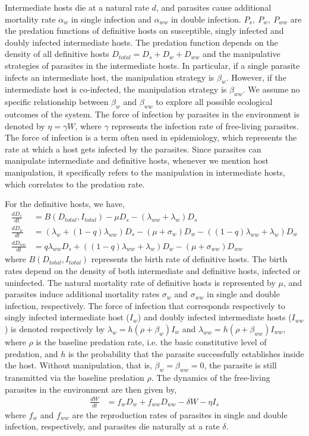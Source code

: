 \documentclass[a4paper]{scrartcl}
\begin{document}
Intermediate hosts die at a natural rate $d$, and parasites cause additional mortality rate $\alpha_w$ in single infection and $\alpha_{ww}$ in double infection.
$P_s, \ P_w, \ P_{ww}$ are the predation functions of definitive hosts on susceptible, singly infected and doubly infected intermediate hosts. 
The predation function depends on the density of all definitive hosts $D_{total} = D_s + D_w + D_{ww}$ and the manipulative strategies of parasites in the intermediate hosts. 
In particular, if a single parasite infects an intermediate host, the manipulation strategy is $\beta_w$. 
However, if the intermediate host is co-infected, the manipulation strategy is $\beta_{ww}$. 
We assume no specific relationship between $\beta_w$ and $\beta_{ww}$ to explore all possible ecological outcomes of the system. 
The force of infection by parasites in the environment is denoted by $\eta = \gamma W$, where $\gamma$ represents the infection rate of free-living parasites. 
The force of infection is a term often used in epidemiology, which represents the rate at which a host gets infected by the parasites.
Since parasites can manipulate intermediate and definitive hosts, whenever we mention host manipulation, it specifically refers to the manipulation in intermediate hosts, which correlates to the predation rate.

For the definitive hosts, we have,
%
\begin{align}
\frac{dD_s}{dt} &= B(D_{total},  I_{total})  - \mu D_s - (\lambda_{ww} + \lambda_w) D_s \nonumber \\    
\frac{dD_w}{dt} &= (\lambda_w + (1 - q) \lambda_{ww}) D_s - (\mu + \sigma_w) D_w - ((1 - q) \lambda_{ww} + \lambda_w) D_w  \label{odes:dhosts} \\         
\frac{dD_{ww}}{dt} &= q \lambda_{ww} D_s + ((1 - q) \lambda_{ww} + \lambda_w) D_w - (\mu + \sigma_{ww}) D_{ww} \nonumber
\end{align}
%
where $B(D_{total},  I_{total})$ represents the birth rate of definitive hosts.
The birth rates depend on the density of both intermediate and definitive hosts, infected or uninfected. 
The natural mortality rate of definitive hosts is represented by $\mu$, and parasites induce additional mortality rates $\sigma_w$ and $\sigma_{ww}$ in single and double infection, respectively.
The force of infection that corresponds respectively to singly infected intermediate host ($I_w$) and doubly infected intermediate hosts ($I_{ww}$) is denoted respectively by $\lambda_w = h (\rho + \beta_w)  I_w$ and $\lambda_{ww} = h (\rho + \beta_{ww}) I_{ww}$, where $\rho$ is the baseline predation rate, i.e. the basic constitutive level of predation, and $h$ is the probability that the parasite successfully establishes inside the host.
Without manipulation, that is, $\beta_w = \beta_{ww} = 0$, the parasite is still transmitted via the baseline predation $\rho$. 
The dynamics of the free-living parasites in the environment are then given by,
\begin{align}
	\frac{dW}{dt} &= f_w D_w + f_{ww} D_{ww} - \delta W - \eta I_s
	\label{odes:eparasite}
\end{align}
where $f_w$ and $f_{ww}$ are the reproduction rates of parasites in single and double infection, respectively, and parasites die naturally at a rate $\delta$.
\end{document}
